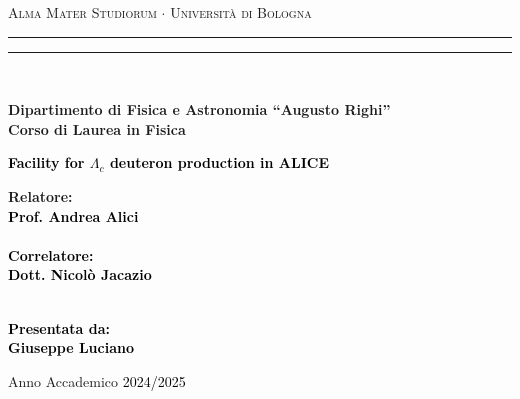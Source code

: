 \documentclass[12pt,a4paper]{book}
\begin{document}
	\begin{titlepage}
		\begin{center}
			{{\Large{\textsc{Alma Mater Studiorum $\cdot$ Universit\`a di Bologna}}}} 
			\rule[0.1cm]{15.8cm}{0.1mm}
			\rule[0.5cm]{15.8cm}{0.6mm}
			\\\vspace{3mm}
			
			{\small{\bf Dipartimento di Fisica e Astronomia “Augusto Righi”\\
					Corso di Laurea in Fisica}}
			
		\end{center}
		
		\vspace{23mm}
		
		\begin{center}\textcolor{black}{
				{\LARGE{\bf Facility for $\Lambda_c$ deuteron production in ALICE}}\\
		}\end{center}
		
		\vspace{50mm} \par \noindent
		
		\begin{minipage}[t]{0.47\textwidth}
			{\large{\bf Relatore: \vspace{2mm}\\\textcolor{black}{
						Prof. Andrea Alici}\\\\
					\textcolor{black}{
						\bf Correlatore: 
						\vspace{2mm}\\
						Dott. Nicolò Jacazio \\\\}}}
		\end{minipage}
		\hfill
		\begin{minipage}[t]{0.47\textwidth}\raggedleft \textcolor{black}{
				{\large{\bf Presentata da:
						\vspace{2mm}\\
						Giuseppe Luciano}}}
		\end{minipage}
		
		\vspace{40mm}
		
		\begin{center}
			Anno Accademico \textcolor{black}{ 2024/2025}
		\end{center}
		
	\end{titlepage}
	
\end{document}
